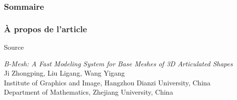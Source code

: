 \documentclass[9pt]{beamer}
\begin{document}
\begin{frame}
	\frametitle{Sommaire}
	\tableofcontents[currentsection]
\end{frame}

\begin{frame}
	\frametitle{À propos de l'article}
	\begin{block}{Source}
		\begin{center}
			\textit{B-Mesh: A Fast Modeling System for Base Meshes of 3D Articulated Shapes} \\
			Ji Zhongping, Liu Ligang, Wang Yigang \\ 
			
			Institute of Graphics and Image, Hangzhou Dianzi University, China \\
			Department of Mathematics, Zhejiang University, China
		\end{center}
	\end{block}
\end{frame}
\end{document}
